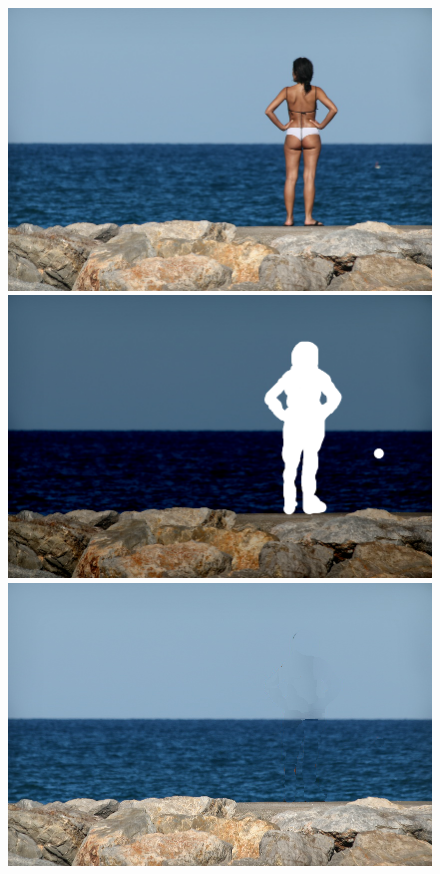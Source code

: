 \documentclass[a4paper, 10pt]{article}
\begin{document}
\begin{figure}[H]
\begin{minipage}{.4\textwidth}
\centering
\includegraphics[scale=0.15]{images/women.png}
\end{minipage}%
\begin{minipage}{.4\textwidth}
\centering
\includegraphics[scale=0.15]{images/women-mask.png}
\end{minipage}%
\begin{minipage}{.4\textwidth}
\centering
\includegraphics[scale=0.15]{inpainted_women27.png}
\end{minipage}%
\end{figure}
\end{document}
